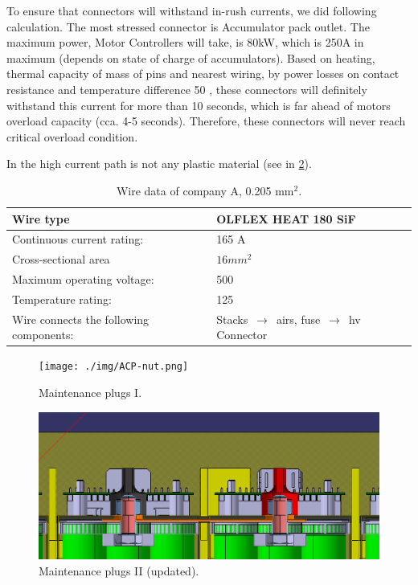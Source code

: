 To ensure that connectors will withstand in-rush currents, we did following calculation. The most stressed connector is Accumulator pack outlet. The maximum power, Motor Controllers will take, is 80kW, which is 250A in maximum (depends on state of charge of accumulators). Based on heating, thermal capacity of mass of pins and nearest wiring, by power losses on contact resistance and temperature difference 50 \degC, these connectors will definitely withstand this current for more than 10 seconds, which is far ahead of motors overload capacity (cca. 4-5 seconds). Therefore, these connectors will never reach critical overload condition.

In the high current path is not any plastic material  (see in \ref{fig:acp-maintance-plug2}).

\begin{table}[htbp]
	\centering
	\caption{Wire data of company A, 0.205 mm$^2$.}
	\begin{tabu}{|X|X|}\hline
		Wire type & OLFLEX HEAT 180 SiF \\\hline
		Continuous current rating: & 165 A \\\hline
		Cross-sectional area & $16mm^2$ \\\hline
		Maximum operating voltage: &  500 \vdc\\\hline
		Temperature rating: &  125 \degC\\\hline
		Wire connects the following components: & Stacks $\,\to\,$ \glspl{air}, fuse $\,\to\,$ \gls{hv} Connector \\\hline
	\end{tabu}%
	\label{tab:acc-wire}%
\end{table}%

\begin{figure}[H]
	\centering
	\texttt{[image: ./img/ACP-nut.png]}
	\caption{Maintenance plugs I.}
	\label{fig:acp-maintance-plug}
\end{figure}

\begin{figure}[H]
	\centering
	\includegraphics[width=\textwidth]{./img/ACP-nut2.png}
	\caption{Maintenance plugs II (updated).}
	\label{fig:acp-maintance-plug2}
\end{figure}

